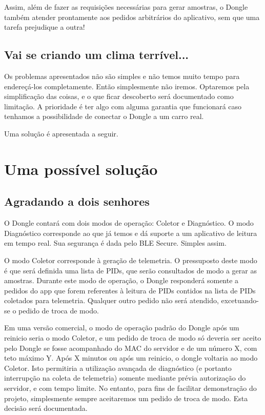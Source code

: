 \documentclass[12pt]{article}
\begin{document}
Assim, além de fazer as requisições necessárias para gerar amostras, o Dongle também atender prontamente aos pedidos arbitrários do aplicativo, sem que uma tarefa prejudique a outra!

\subsection{Vai se criando um clima terrível...}

Os problemas apresentados não são simples e não temos muito tempo para endereçá-los completamente. Então simplesmente não iremos. Optaremos pela simplificação das coisas, e o que ficar descoberto será documentado como limitação. A prioridade é ter algo com alguma garantia que funcionará caso tenhamos a possibilidade de conectar o Dongle a um carro real. 

Uma solução é apresentada a seguir.

\section{Uma possível solução}

\subsection{Agradando a dois senhores}

O Dongle contará com dois modos de operação: Coletor e Diagnóstico. O modo Diagnóstico corresponde ao que já temos e dá suporte a um aplicativo de leitura em tempo real. Sua segurança é dada pelo BLE Secure. Simples assim.

O modo Coletor corresponde à geração de telemetria. O pressuposto deste modo é que será definida uma lista de PIDs, que serão consultados de modo a gerar as amostras. Durante este modo de operação, o Dongle responderá somente a pedidos do app que forem referentes à leitura de PIDs contidos na lista de PIDs coletados para telemetria. Qualquer outro pedido não será atendido, excetuando-se o pedido de troca de modo. 

Em uma versão comercial, o modo de operação padrão do Dongle após um reinicio seria o modo Coletor, e um pedido de troca de modo só deveria ser aceito pelo Dongle se fosse acompanhado do MAC do servidor e de um número X, com teto máximo Y. Após X minutos ou após um reinicio, o dongle voltaria ao modo Coletor. Isto permitiria a utilização avançada de diagnóstico (e portanto interrupção na coleta de telemetria) somente mediante prévia autorização do servidor, e com tempo limite. No entanto, para fins de facilitar demonstração do projeto, simplesmente sempre aceitaremos um pedido de troca de modo. Esta decisão será documentada.
\end{document}
